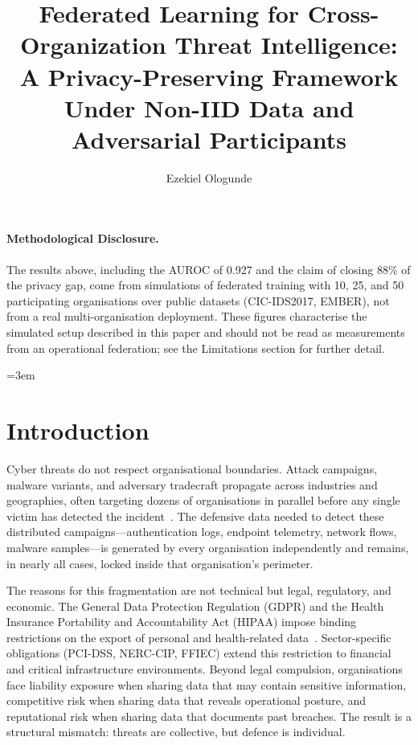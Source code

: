 \documentclass[sigconf,nonacm]{acmart}
\title{Federated Learning for Cross-Organization Threat Intelligence: A Privacy-Preserving Framework Under Non-IID Data and Adversarial Participants}
\author{Ezekiel Ologunde}
\affiliation{%
  \institution{Independent Researcher}
  \city{Boston}
  \state{MA}
  \country{USA}}
\begin{document}
\maketitle

\paragraph{Methodological Disclosure.} The results above, including the AUROC of 0.927 and the claim of closing 88\% of the privacy gap, come from simulations of federated training with 10, 25, and 50 participating organisations over public datasets (CIC-IDS2017, EMBER), not from a real multi-organisation deployment. These figures characterise the simulated setup described in this paper and should not be read as measurements from an operational federation; see the Limitations section for further detail.

\sloppy
{}
\emergencystretch=3em
\hfuzz=12pt

\section{Introduction}

Cyber threats do not respect organisational boundaries. Attack campaigns,
malware variants, and adversary tradecraft propagate across industries and
geographies, often targeting dozens of organisations in parallel before any
single victim has detected the
incident~\cite{mandiant2024mtrends,verizon2024dbir}. The defensive data
needed to detect these distributed campaigns---authentication logs,
endpoint telemetry, network flows, malware samples---is generated by every
organisation independently and remains, in nearly all cases, locked
inside that organisation's perimeter.

The reasons for this fragmentation are not technical but legal, regulatory,
and economic. The General Data Protection Regulation (GDPR) and the Health
Insurance Portability and Accountability Act (HIPAA) impose binding
restrictions on the export of personal and health-related
data~\cite{eu2018gdpr,hhs1996hipaa}. Sector-specific obligations
(PCI-DSS, NERC-CIP, FFIEC) extend this restriction to financial and
critical infrastructure environments. Beyond legal compulsion, organisations
face liability exposure when sharing data that may contain sensitive
information, competitive risk when sharing data that reveals operational
posture, and reputational risk when sharing data that documents past
breaches. The result is a structural mismatch: threats are collective,
but defence is individual.
\end{document}
